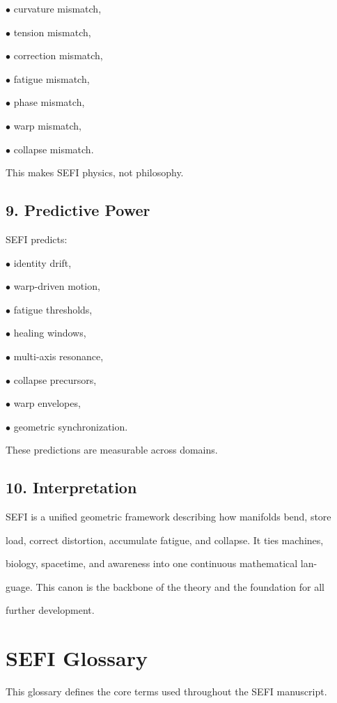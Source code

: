 \documentclass[10pt]{article}
\begin{document}
\noindent $\bullet$ curvature mismatch,

\noindent $\bullet$ tension mismatch,

\noindent $\bullet$ correction mismatch,

\noindent $\bullet$ fatigue mismatch,

\noindent $\bullet$ phase mismatch,

\noindent $\bullet$ warp mismatch,

\noindent $\bullet$ collapse mismatch.

This makes SEFI physics, not philosophy.

\subsection*{9. Predictive Power}
SEFI predicts:

\noindent $\bullet$ identity drift,

\noindent $\bullet$ warp-driven motion,

\noindent $\bullet$ fatigue thresholds,

\noindent $\bullet$ healing windows,

\noindent $\bullet$ multi-axis resonance,

\noindent $\bullet$ collapse precursors,

\noindent $\bullet$ warp envelopes,

\noindent $\bullet$ geometric synchronization.

These predictions are measurable across domains.


\subsection*{10. Interpretation}
SEFI is a unified geometric framework describing how manifolds bend, store

load, correct distortion, accumulate fatigue, and collapse. It ties machines,

biology, spacetime, and awareness into one continuous mathematical lan-

guage. This canon is the backbone of the theory and the foundation for all

further development.

\section*{SEFI Glossary}
This glossary defines the core terms used throughout the SEFI manuscript.
\end{document}
